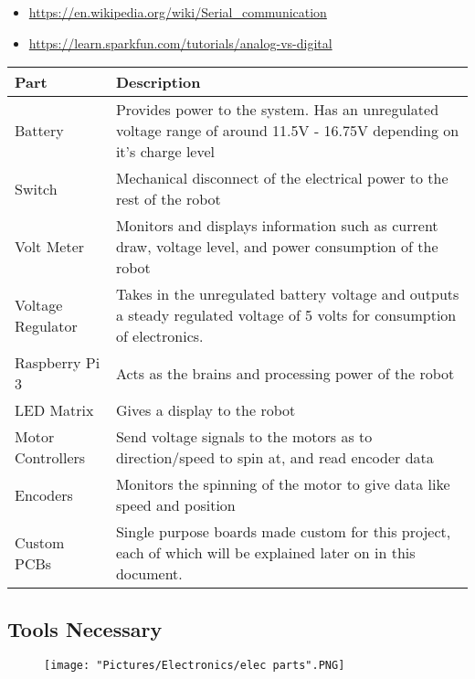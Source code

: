 \documentclass[12pt]{article}
\begin{document}
\begin{itemize}
	\item \href{https://en.wikipedia.org/wiki/Serial_communication}{https://en.wikipedia.org/wiki/Serial\_communication}
	\item \href{https://learn.sparkfun.com/tutorials/analog-vs-digital}{https://learn.sparkfun.com/tutorials/analog-vs-digital}
\end{itemize}


\begin{tabular}[2]{|p{4cm}|p{11cm}|}
	\hline
	\textbf{Part} & \textbf{Description} \\ \hline
	Battery & Provides power to the system. Has an unregulated voltage range of around 11.5V - 16.75V depending on it's charge level \\ \hline
	Switch & Mechanical disconnect of the electrical power to the rest of the robot \\ \hline
	Volt Meter & Monitors and displays information such as current draw, voltage level, and power consumption of the robot \\ \hline
	Voltage Regulator & Takes in the unregulated battery voltage and outputs a steady regulated voltage of 5 volts for consumption of electronics. \\ \hline
	Raspberry Pi 3 & Acts as the brains and processing power of the robot \\ \hline
	LED Matrix & Gives a display to the robot \\ \hline
	Motor Controllers & Send voltage signals to the motors as to direction/speed to spin at, and read encoder data \\ \hline
	Encoders & Monitors the spinning of the motor to give data like speed and position \\ \hline
	Custom PCBs & Single purpose boards made custom for this project, each of which will be explained later on in this document. \\ \hline
\end{tabular}

\subsection{Tools Necessary}

\begin{figure}[H]
  	\centering
   	\texttt{[image: "Pictures/Electronics/elec parts".PNG]}
  	\caption{}
	\label{elec parts}
\end{figure}
\end{document}
